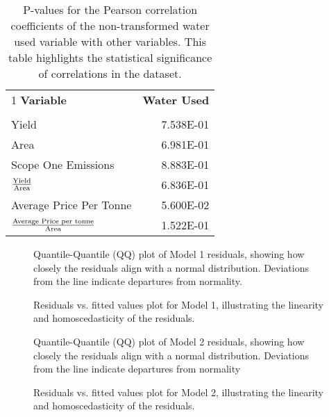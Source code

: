 \documentclass[10pt,letterpaper]{article}
\begin{document}
\begin{table}[htb]
    \caption{P-values for the Pearson correlation coefficients of the non-transformed water used variable with other variables. This table highlights the statistical significance of correlations in the dataset.}\label{tab:waterppc}
  \begin{tabular}{lr}
    \toprule1
      \textbf{Variable }                                          & \textbf{Water Used} \\ \\ \midrule
      Yield                                              & 7.538E-01  \\
      Area                                               & 6.981E-01  \\
      Scope One Emissions                                & 8.883E-01  \\
      $\textrm{Yield}\over\textrm{Area}$                     & 6.836E-01  \\
      Average Price Per Tonne                            & 5.600E-02  \\
      ${\textrm{Average Price per tonne}\over\textrm{Area}}$ & 1.522E-01 \\ \bottomrule
    \end{tabular}
  \end{table}

\begin{figure}[htb]
  \caption{Quantile-Quantile (QQ) plot of Model 1 residuals, showing how closely the residuals align with a normal distribution. Deviations from the line indicate departures from normality.}
\end{figure}

\begin{figure}[htb]
  \caption{Residuals vs. fitted values plot for Model 1, illustrating the linearity and homoscedasticity of the residuals.}
\end{figure}

\begin{figure}[htb]
  \caption{Quantile-Quantile (QQ) plot of Model 2 residuals, showing how closely the residuals align with a normal distribution. Deviations from the line indicate departures from normality}
\end{figure}

\begin{figure}[htb]
  \caption{Residuals vs. fitted values plot for Model 2, illustrating the linearity and homoscedasticity of the residuals.}
\end{figure}
\end{document}
